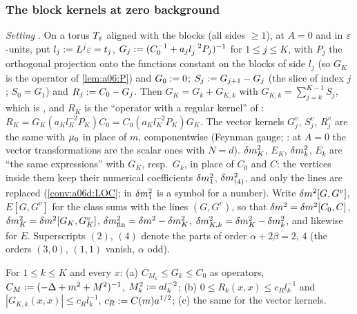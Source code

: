 
\subsubsection*{The block kernels at zero background}

\emph{Setting} \cite[(1.25)--(1.28), p.~418]{Ba3}. On a torus $T_{\varepsilon}$ aligned with the blocks (all sides $\ge1$), at $A=0$ and in $\varepsilon$-units, put $l_j:= L^j\varepsilon=t_j$, $G_j:=(C_0^{-1}+a_jl_j^{-2}P_j)^{-1}$ for $1\le j\le K$, with $P_j$ the orthogonal projection onto the functions constant on the blocks of side $l_j$ (so $G_K$ is the operator of \cref{lem:a06:P}) and $G_0:=0$; $S_j:= G_{j+1}-G_j$ (the slice of index $j$; $S_0=G_1$) and $R_j:= C_0-G_j$. Then $G_K=G_k+G_{K,k}$ with $G_{K,k}=\sum_{j=k}^{K-1}S_j$, which is \cite[(1.27)]{Ba3}, and $R_K$ is the ``operator with a regular kernel'' of \cite[(1.25)]{Ba3}: $R_K=G_K(a_Kl_K^{-2}P_K)C_0=C_0(a_Kl_K^{-2}P_K)G_K$. The vector kernels $G^v_j$, $S^v_j$, $R^v_j$ are the same with $\mu_0$ in place of $m$, componentwise (Feynman gauge; \cite[p.~608]{Ba1}: at $A=0$ the vector transformations are the scalar ones with $N=d$). $\delta m^2_K$, $E_K$, $\delta m^2_k$, $E_k$ are ``the same expressions'' \cite[(1.26), (1.28)]{Ba3} with $G_K$, resp.\ $G_k$, in place of $C_0$ and $C$: the \cite[(1.7)]{Ba3} vertices inside them keep their numerical coefficients $\delta m^2_1$, $\delta m^2_{(4)}$, and only the lines are replaced (\cref{conv:a06d:LOC}; in \cite[(1.23)]{Ba3} $\delta m^2_1$ is a symbol for a number). Write $\delta m^2[G,G^v]$, $E[G,G^v]$ for the class sums \cite[(1.23)--(1.24)]{Ba3} with the lines $(G,G^v)$, so that $\delta m^2=\delta m^2[C_0,C]$, $\delta m^2_K=\delta m^2[G_K,G^v_K]$, $\delta m^2_{\mathrm{fin}}=\delta m^2-\delta m^2_K$, $\delta m^2_{K,k}=\delta m^2_K-\delta m^2_k$, and likewise for $E$. Superscripts $(2)$, $(4)$ denote the parts of order $\alpha+2\beta=2$, $4$ (the orders $(3,0)$, $(1,1)$ vanish, $\alpha$ odd).

\begin{lemma}\label{lem:a06e:B0}
For $1\le k\le K$ and every $x$: \textup{(a)} $C_{M_k}\le G_k\le C_0$ as operators, $C_M:=(-\Delta+m^2+M^2)^{-1}$, $M_k^2:= al_k^{-2}$; \textup{(b)} $0\le R_k(x,x)\le c_Rl_k^{-1}$ and $|G_{K,k}(x,x)|\le c_Rl_k^{-1}$, $c_R:= C(m)a^{1/2}$; \textup{(c)} the same for the vector kernels.
\end{lemma}

